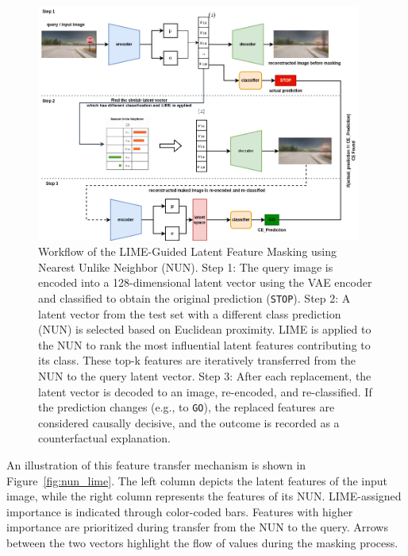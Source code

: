 \begin{figure}[htbp]
    \centering
    \includegraphics[width=0.95\textwidth]{img/masking/lime_on_latent_nun/lime_on_latent_featuring_using_NUN.png}
    \caption{
    Workflow of the LIME-Guided Latent Feature Masking using Nearest Unlike Neighbor (NUN). 
    Step 1: The query image is encoded into a 128-dimensional latent vector using the VAE encoder and classified to obtain the original prediction (\texttt{STOP}).  
    Step 2: A latent vector from the test set with a different class prediction (NUN) is selected based on Euclidean proximity. LIME is applied to the NUN to rank the most influential latent features contributing to its class. These top-k features are iteratively transferred from the NUN to the query latent vector.  
    Step 3: After each replacement, the latent vector is decoded to an image, re-encoded, and re-classified. If the prediction changes (e.g., to \texttt{GO}), the replaced features are considered causally decisive, and the outcome is recorded as a counterfactual explanation.
    }
    \label{fig:nun_lime_workflow}
\end{figure}


An illustration of this feature transfer mechanism is shown in Figure~\ref{fig:nun_lime}. The left column depicts the latent features of the input image, while the right column represents the features of its NUN. LIME-assigned importance is indicated through color-coded bars. Features with higher importance are prioritized during transfer from the NUN to the query. Arrows between the two vectors highlight the flow of values during the masking process.


